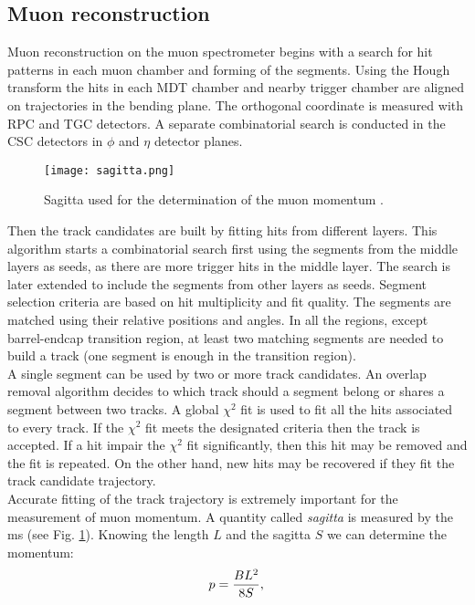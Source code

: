     \subsection{Muon reconstruction}
    Muon reconstruction on the muon spectrometer begins with a search for hit patterns in each muon chamber and forming of the segments. Using the Hough transform \cite{ILLINGWORTH198887} the hits in each MDT chamber and nearby trigger chamber are aligned on trajectories in the bending plane. The orthogonal coordinate is measured with RPC and TGC detectors. A separate combinatorial search is conducted in the CSC detectors in $\phi$ and $\eta$ detector planes.\\
     \begin{figure}[htbp]
    	\centering
    	\texttt{[image: sagitta.png]}
    	\caption[sagitta]{Sagitta used for the determination of the muon momentum \cite{Kaiser:2010zea}.}
    	\label{fig::sagitta}
    \end{figure}
    Then the track candidates are built by fitting hits from different layers. This algorithm starts a combinatorial search first using the segments from the middle layers as seeds, as there are more trigger hits in the middle layer. The search is later extended to include the segments from other layers as seeds. Segment selection criteria are based on hit multiplicity and fit quality. The segments are matched using their relative positions and angles. In all the regions, except barrel-endcap transition region, at least two matching segments are needed to build a track (one segment is enough in the transition region).\\
    A single segment can be used by two or more track candidates. An overlap removal algorithm decides to which track should a segment belong or shares a segment between two tracks. A global $\chi^2$ fit is used to fit all the hits associated to every track. If the $\chi^2$ fit meets the designated criteria then the track is accepted. If a hit impair the $\chi^2$ fit significantly, then this hit may be removed and the fit is repeated. On the other hand, new hits may be recovered if they fit the track candidate trajectory. \\
    Accurate fitting of the track trajectory is extremely important for the measurement of muon momentum. A quantity called \textit{sagitta} is measured by the \gls{ms} (see Fig. \ref{fig::sagitta}). Knowing the length $L$ and the sagitta $S$ we can determine the momentum:
    	\begin{equation}
    p = \frac{BL^2}{8S},\\
    \end{equation}
